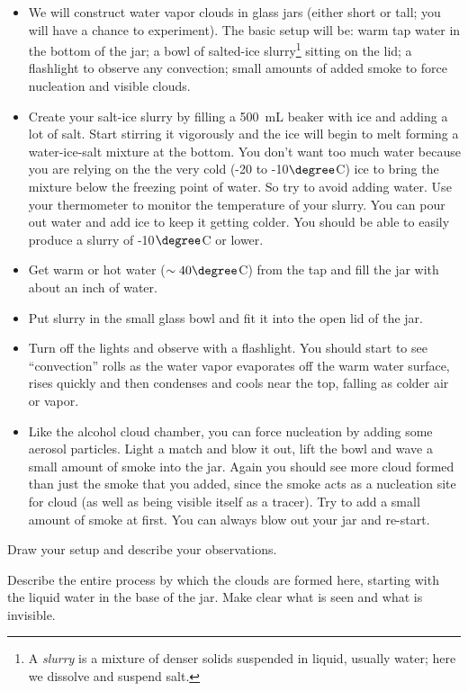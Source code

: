 	\begin{itemize}
	\item We will construct water vapor clouds in glass jars (either short or tall; you will have a chance to experiment).  The basic setup will be: warm tap water in the bottom of the jar; a bowl of salted-ice slurry\footnote{A {\em slurry} is a mixture of denser solids suspended in liquid, usually water; here we dissolve and suspend salt.} sitting on the lid; a flashlight to observe any convection; small amounts of added smoke to force nucleation and visible clouds.
	\item Create your salt-ice slurry by filling a 500~mL beaker with ice and adding a lot of salt.  Start stirring it vigorously and the ice will begin to melt forming a water-ice-salt mixture at the bottom.  You don't want too much water because you are relying on the the very cold (-20 to -10$\degree$C) ice to bring the mixture below the freezing point of water. So try to avoid adding water.  Use your thermometer to monitor the temperature of your slurry.  You can pour out water and add ice to keep it getting colder.  You should be able to easily produce a slurry of -10$\degree$C or lower.
	\item Get warm or hot water ($\sim40\degree$C) from the tap and fill the jar with about an inch of water.  
	\item Put slurry in the small glass bowl and fit it into the open lid of the jar.
	\item Turn off the lights and observe with a flashlight.  You should start to see ``convection'' rolls as the water vapor evaporates off the warm water surface, rises quickly and then condenses and cools near the top, falling as colder air or vapor.  
	\item Like the alcohol cloud chamber, you can force nucleation by adding some aerosol particles.  Light a match and blow it out, lift the bowl and wave a small amount of smoke into the jar.  Again you should see more cloud formed than just the smoke that you added, since the smoke acts as a nucleation site for cloud (as well as being visible itself as a tracer). Try to add a small amount of smoke at first.  You can always blow out your jar and re-start.
	\end{itemize}
Draw your setup and describe your observations.  

\answerspace[7cm]
	
\noindent Describe the entire process by which the clouds are formed here, starting with the liquid water in the base of the jar.  Make clear what is seen and what is invisible.

